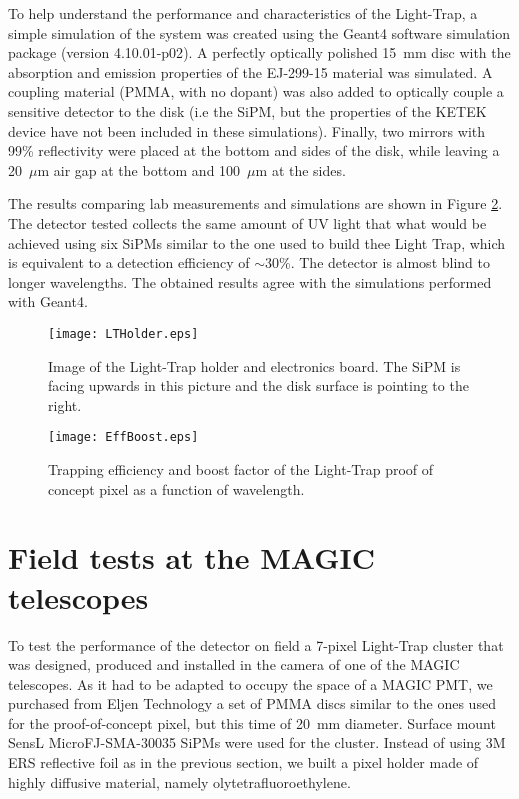 \documentclass{PoS}
\begin{document}
To help understand the performance and characteristics of the Light-Trap, a simple simulation of the system was created using the Geant4 software simulation package (version 4.10.01-p02\cite{b}). A perfectly optically polished 15~mm disc with the absorption and emission properties of the EJ-299-15 material was simulated. A coupling material (PMMA, with no dopant) was also added to optically couple a sensitive detector to the disk (i.e the SiPM, but the properties of the KETEK device have not been included in these simulations). Finally, two mirrors with 99\% reflectivity were placed at the bottom and sides of the disk, while leaving a 20~$\mu$m air gap at the bottom and 100~$\mu$m at the sides.

The results comparing lab measurements and simulations are shown in Figure \ref{fig:EffBoost}. The detector tested collects the same amount of UV light that what would be achieved using six SiPMs similar to the one used to build thee Light Trap, which is equivalent to a detection efficiency of $\sim$30\%. The detector is almost blind to longer wavelengths. The obtained results agree with the simulations performed with  Geant4.

\begin{figure}
   \centering
   \texttt{[image: LTHolder.eps]} %
   \caption{Image of the Light-Trap holder and electronics board. The SiPM is facing upwards in this picture and the disk surface is pointing to the right.}
   \label{fig:LTHold}
\end{figure}

\begin{figure}
   \centering
   \texttt{[image: EffBoost.eps]} %
   \caption{Trapping efficiency and boost factor of the Light-Trap proof of concept pixel as a function of wavelength.}
   \label{fig:EffBoost}
\end{figure}


\section{Field tests at the MAGIC telescopes}

To test the performance of the detector on field  a 7-pixel Light-Trap cluster that was designed, produced and installed in the camera of one of the MAGIC telescopes\cite{upgrade1}. As it had to be adapted to occupy the space of a MAGIC PMT, we purchased from Eljen Technology a set of PMMA discs similar to the ones used for the proof-of-concept pixel, but this time of 20~mm diameter. Surface mount SensL MicroFJ-SMA-30035 SiPMs were used for the cluster. Instead of using 3M\textsuperscript{\textregistered} ERS reflective foil as in the previous section, we built a pixel holder made of highly diffusive material, namely olytetrafluoroethylene.
\end{document}
